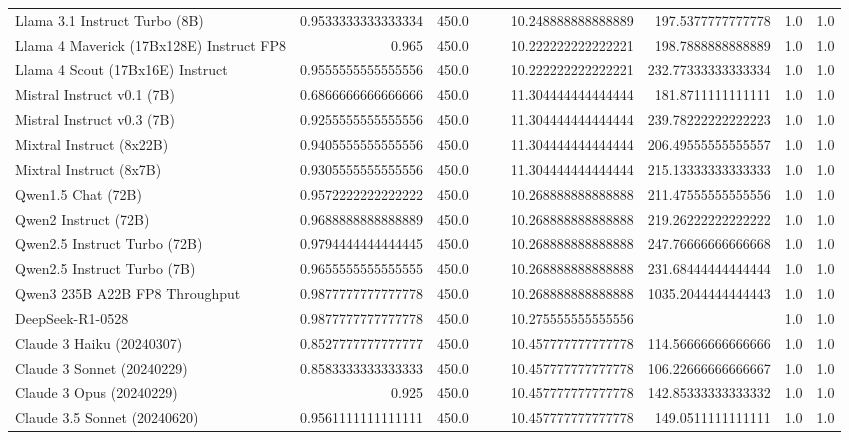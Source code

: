 \begin{table}[htp]
{\begin{tabular}{lrrrrrrrr}
Llama 3.1 Instruct Turbo (8B) & 0.9533333333333334 & 450.0 &  &  & 10.248888888888889 & 197.5377777777778 & 1.0 & 1.0 \\
Llama 4 Maverick (17Bx128E) Instruct FP8 & 0.965 & 450.0 &  &  & 10.222222222222221 & 198.7888888888889 & 1.0 & 1.0 \\
Llama 4 Scout (17Bx16E) Instruct & 0.9555555555555556 & 450.0 &  &  & 10.222222222222221 & 232.77333333333334 & 1.0 & 1.0 \\
Mistral Instruct v0.1 (7B) & 0.6866666666666666 & 450.0 &  &  & 11.304444444444444 & 181.8711111111111 & 1.0 & 1.0 \\
Mistral Instruct v0.3 (7B) & 0.9255555555555556 & 450.0 &  &  & 11.304444444444444 & 239.78222222222223 & 1.0 & 1.0 \\
Mixtral Instruct (8x22B) & 0.9405555555555556 & 450.0 &  &  & 11.304444444444444 & 206.49555555555557 & 1.0 & 1.0 \\
Mixtral Instruct (8x7B) & 0.9305555555555556 & 450.0 &  &  & 11.304444444444444 & 215.13333333333333 & 1.0 & 1.0 \\
Qwen1.5 Chat (72B) & 0.9572222222222222 & 450.0 &  &  & 10.268888888888888 & 211.47555555555556 & 1.0 & 1.0 \\
Qwen2 Instruct (72B) & 0.9688888888888889 & 450.0 &  &  & 10.268888888888888 & 219.26222222222222 & 1.0 & 1.0 \\
Qwen2.5 Instruct Turbo (72B) & 0.9794444444444445 & 450.0 &  &  & 10.268888888888888 & 247.76666666666668 & 1.0 & 1.0 \\
Qwen2.5 Instruct Turbo (7B) & 0.9655555555555555 & 450.0 &  &  & 10.268888888888888 & 231.68444444444444 & 1.0 & 1.0 \\
Qwen3 235B A22B FP8 Throughput & 0.9877777777777778 & 450.0 &  &  & 10.268888888888888 & 1035.2044444444443 & 1.0 & 1.0 \\
DeepSeek-R1-0528 & 0.9877777777777778 & 450.0 &  &  & 10.275555555555556 &  & 1.0 & 1.0 \\
Claude 3 Haiku (20240307) & 0.8527777777777777 & 450.0 &  &  & 10.457777777777778 & 114.56666666666666 & 1.0 & 1.0 \\
Claude 3 Sonnet (20240229) & 0.8583333333333333 & 450.0 &  &  & 10.457777777777778 & 106.22666666666667 & 1.0 & 1.0 \\
Claude 3 Opus (20240229) & 0.925 & 450.0 &  &  & 10.457777777777778 & 142.85333333333332 & 1.0 & 1.0 \\
Claude 3.5 Sonnet (20240620) & 0.9561111111111111 & 450.0 &  &  & 10.457777777777778 & 149.0511111111111 & 1.0 & 1.0 \\

\end{tabular}}
\end{table}
